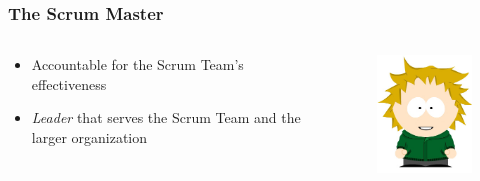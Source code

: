 \begin{frame}
	\frametitle{The Scrum Master}
	
	\begin{columns}
		\begin{column}{0.7\textwidth}
			\begin{itemize}
				\setlength\itemsep{0.7em}
				\item Accountable for the Scrum Team's effectiveness
				\item \textit{Leader} that serves the Scrum Team and the larger organization
			\end{itemize}
		\end{column}
		\begin{column}{0.3\textwidth}
			\vspace{-2em}
			\begin{figure}
				\includegraphics[width=1.6in]{images/sm.jpg}\\
			\end{figure}
		\end{column}
	\end{columns}
\end{frame}